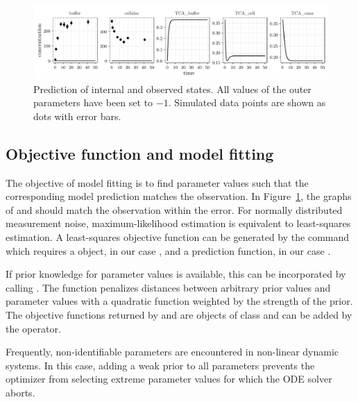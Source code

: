 \documentclass[article]{jss}
\begin{document}
\begin{figure}[ht]
	\centering
	\includegraphics[width = \textwidth]{images/figure3}
	\caption{Prediction of internal and observed states. All values of the outer parameters have been set to $-1$. Simulated data points are shown as dots with error bars.}
	\label{fig:gxp}
\end{figure}

\subsection{Objective function and model fitting}
The objective of model fitting is to find parameter values such that the corresponding model prediction matches the observation. In Figure~\ref{fig:gxp}, the graphs of  and  should match the observation within the error.
For normally distributed measurement noise, maxi\-mum-likelihood estimation is equivalent to least-squares estimation. A least-squares objective function can be generated by the  command which requires a  object, in our case , and a prediction function, in our case .


If prior knowledge for parameter values is available, this can be incorporated by calling . The function penalizes distances between arbitrary prior values and parameter values with a quadratic function weighted by the strength of the prior. The objective functions returned by  and  are objects of class  and can be added by the  operator.

Frequently, non-identifiable parameters are encountered in non-linear dynamic systems. In this case, adding a weak prior to all parameters prevents the optimizer from selecting extreme parameter values for which the ODE solver aborts. 
\end{document}
